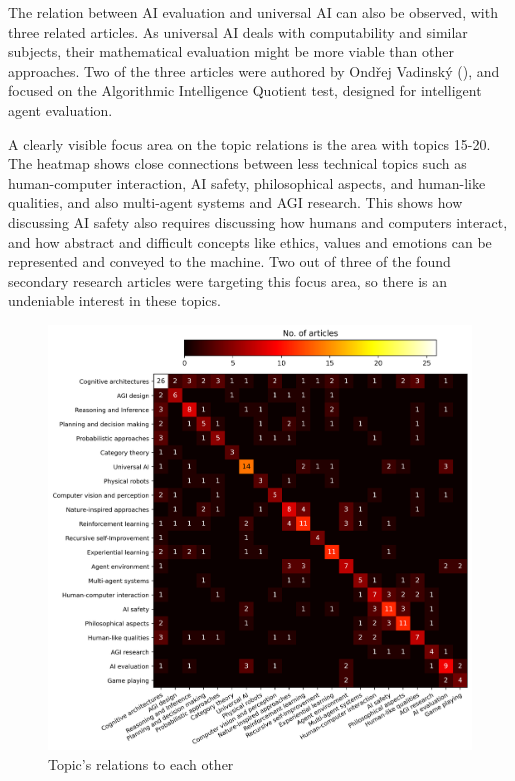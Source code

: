 The relation between AI evaluation and universal AI can also be observed, with
three related articles. As universal AI deals with computability and similar
subjects, their mathematical evaluation might be more viable than other
approaches. Two of the three articles were authored by Ond\v rej
Vadinsk\'y (\cite*{vadinsky2018lessons,vadinsky2018sema}), and focused on the
Algorithmic Intelligence Quotient test, designed for intelligent agent
evaluation.

A clearly visible focus area on the topic relations is the area with topics
15-20. The heatmap shows close connections between less technical topics such as
human-computer interaction, AI safety, philosophical aspects, and human-like
qualities, and also multi-agent systems and AGI research. This shows how
discussing AI safety also requires discussing how humans and computers interact,
and how abstract and difficult concepts like ethics, values and emotions can be
represented and conveyed to the machine. Two out of three of the found secondary
research articles were targeting this focus area, so there is an undeniable
interest in these topics.


\begin{figure}[H]
  \centering
  \includegraphics[scale=0.65]{material/data/topic_heatmap_no_zeroes.png}
  \caption{Topic's relations to each other}
  \label{fig:topicheat}
\end{figure}


